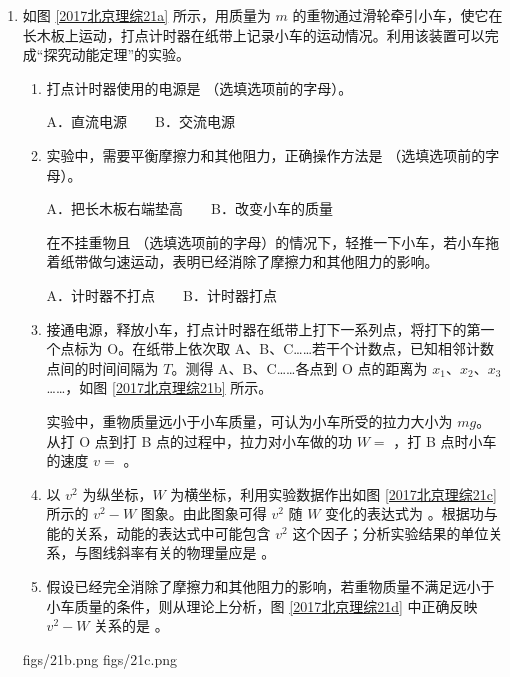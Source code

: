 \documentclass[\gkver]{gaokaozhenti}
\begin{document}
\begin{enumerate}
\item
如图 \ref{2017北京理综21a} 所示，用质量为 $m$ 的重物通过滑轮牵引小车，使它在长木板上运动，打点计时器在纸带上记录小车的运动情况。利用该装置可以完成“探究动能定理”的实验。

\begin{enumerate}
	\item
	打点计时器使用的电源是 （选填选项前的字母）。

	A．直流电源　　B．交流电源

	\item
	实验中，需要平衡摩擦力和其他阻力，正确操作方法是 （选填选项前的字母）。

	A．把长木板右端垫高　　B．改变小车的质量

	在不挂重物且 （选填选项前的字母）的情况下，轻推一下小车，若小车拖着纸带做匀速运动，表明已经消除了摩擦力和其他阻力的影响。

	A．计时器不打点　　B．计时器打点

	\item
	接通电源，释放小车，打点计时器在纸带上打下一系列点，将打下的第一个点标为 O。在纸带上依次取 A、B、C……若干个计数点，已知相邻计数点间的时间间隔为 $T$。测得 A、B、C……各点到 O 点的距离为 $x_{1}$、$x_{2}$、$x_{3}$……，如图 \ref{2017北京理综21b} 所示。

	实验中，重物质量远小于小车质量，可认为小车所受的拉力大小为 $mg$。从打 O 点到打 B 点的过程中，拉力对小车做的功 $W =$ ，打 B 点时小车的速度 $v =$ 。

	\item
	以 $v^{2}$ 为纵坐标，$W$ 为横坐标，利用实验数据作出如图 \ref{2017北京理综21c} 所示的 $v^{2}-W$ 图象。由此图象可得 $v^{2}$ 随 $W$ 变化的表达式为 。根据功与能的关系，动能的表达式中可能包含 $v^{2}$ 这个因子；分析实验结果的单位关系，与图线斜率有关的物理量应是 。

	\item
	假设已经完全消除了摩擦力和其他阻力的影响，若重物质量不满足远小于小车质量的条件，则从理论上分析，图 \ref{2017北京理综21d} 中正确反映 $v^{2}-W$ 关系的是 。
\end{enumerate}

{figs/21b.png}
{figs/21c.png}
{}


\end{enumerate}
\end{document}
